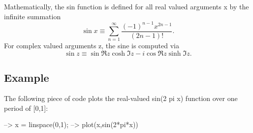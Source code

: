 Mathematically, the {\ttfamily sin} function is defined for all real valued arguments {\ttfamily x} by the infinite summation \[ \sin x \equiv \sum_{n=1}^{\infty} \frac{(-1)^{n-1} x^{2n-1}}{(2n-1)!}. \] For complex valued arguments {\ttfamily z}, the sine is computed via \[ \sin z \equiv \sin \Re z \cosh \Im z - i \cos \Re z \sinh \Im z. \] \hypertarget{variables_struct_Example}{}\subsection{Example}\label{variables_struct_Example}
The following piece of code plots the real-\/valued {\ttfamily sin(2 pi x)} function over one period of {\ttfamily \mbox{[}0,1\mbox{]}}\-:


\begin{DoxyVerbInclude}
--> x = linspace(0,1);
--> plot(x,sin(2*pi*x))
\end{DoxyVerbInclude}


